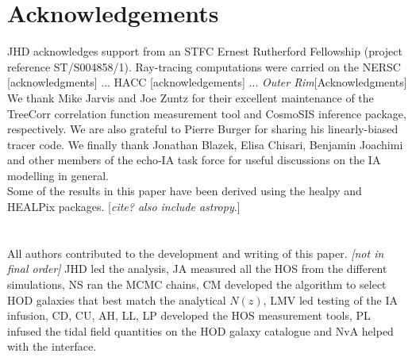 \section*{Acknowledgements}

JHD acknowledges support from an STFC Ernest Rutherford Fellowship (project reference ST/S004858/1). 
Ray-tracing computations were carried on the NERSC [acknowledgments] ... HACC [acknowledgements] ... {\it Outer Rim}[Acknowledgments]
We thank Mike Jarvis and Joe Zuntz for their excellent maintenance of the {\sc TreeCorr} correlation function measurement tool and {\sc CosmoSIS} inference package, respectively. We are also grateful to Pierre Burger for sharing his linearly-biased tracer code. We finally thank Jonathan Blazek, Elisa Chisari, Benjamin Joachimi and other members of the echo-IA task force for useful discussions on the IA modelling in general.
\\

Some of the results in this paper have been derived using the {\sc healpy} and {\sc HEALPix} packages. [{\it cite? also include {\sc astropy}}.] 
\\
\\
\\
{\footnotesize All authors contributed to the development and writing of this paper. {\it [not in final order]} 
JHD led the analysis, JA measured all the HOS from the different simulations, NS ran the MCMC chains,  CM developed the algorithm to select HOD galaxies that best match the analytical $N(z)$, LMV led testing of the IA infusion, CD, CU, AH, LL, LP developed the HOS measurement tools,  PL infused the tidal field quantities on the HOD galaxy catalogue and NvA helped with the interface. }